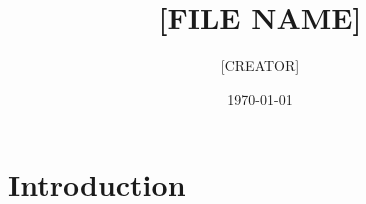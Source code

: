 \documentclass{article}
\title{[FILE NAME]}
\author{[CREATOR]}
\date{\today} %
\begin{document}
\maketitle


\section{Introduction}
\end{document}
